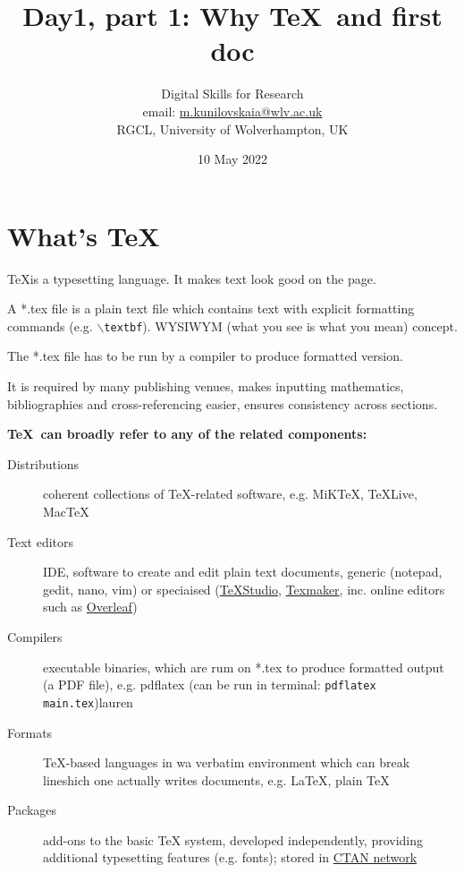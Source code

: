 \documentclass[a4paper,11pt]{article}  %
\title{Day1, part 1: Why \TeX~and first doc}
\author{Digital Skills for Research \\ 
	email: \href{m.kunilovskaia@wlv.ac.uk}{m.kunilovskaia@wlv.ac.uk} \\ 
	RGCL, University of Wolverhampton, UK}
\date{10 May 2022}
\begin{document}
\maketitle

\tableofcontents


\section{What's \TeX}
\begin{tcolorbox}[width=\textwidth,colback={yellow!50!white}]
	\TeX is a typesetting language. It makes text look good on the page. 
	\medskip
	
	A *.tex file is a plain text file which contains text with explicit formatting commands (e.g. \texttt{$\backslash$textbf}). WYSIWYM (what you see is what you mean) concept.
	
	The *.tex file has to be run by a compiler to produce formatted version.
	\medskip
	
	It is required by many publishing venues, makes inputting mathematics, bibliographies and cross-referencing easier, ensures consistency across sections.
	
\end{tcolorbox}   

\vspace{1em}

\textbf{\Large{\TeX~can broadly refer to any of the related components:}}

\begin{description}
	\item[Distributions] coherent collections of TeX-related software, e.g. MiKTeX, TeXLive, MacTeX
	\item[Text editors] IDE, software to create and edit plain text documents, generic (notepad, gedit, nano, vim) or speciaised (\href{http://texstudio.sourceforge.net/}{TeXStudio}, \href{https://www.xm1math.net/texmaker/}{Texmaker}, inc. online editors such as \href{https://www.overleaf.com}{Overleaf})
	\item[Compilers] executable binaries, which are rum on *.tex to produce formatted output (a PDF file), e.g. pdflatex (can be run in terminal: \texttt{pdflatex main.tex})lauren
	\item[Formats] TeX-based languages in wa verbatim environment which can break lineshich one actually writes documents, e.g. LaTeX, plain TeX
	\item[Packages] add-ons to the basic TeX system, developed independently, providing additional typesetting features (e.g. fonts); stored in \href{https://ctan.org/}{CTAN network}
\end{description}
\end{document}
